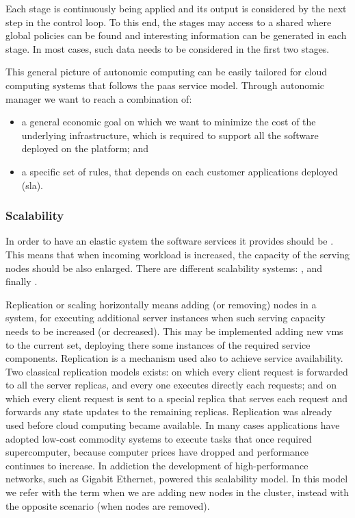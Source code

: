 Each stage is continuously being applied and its output is considered by the next step in the control
loop. To this end, the stages may access to a shared  where global policies
can be found and interesting information can be generated in each stage. In most cases, such data
needs to be considered in the first two stages.

This general picture of autonomic computing can be easily tailored for cloud computing systems that
follows the \ac{paas} service model. Through autonomic manager we want to reach a combination of:

\begin{itemize}
	\item{a general economic goal on which we want to minimize the cost of the underlying infrastructure,
		which is required to support all the software deployed on the platform; and}
	\item{a specific set of rules, that depends on each customer applications deployed (\ac{sla}).}
\end{itemize}

\subsubsection*{Scalability}
\label{sec:elasticity-requirements-scalability}
In order to have an elastic system the software services it provides should be . This
means that when incoming workload is increased, the capacity of the serving nodes should be also
enlarged. There are different scalability systems: ,  and
finally .

Replication or scaling horizontally means adding (or removing) nodes in a system, for executing additional
server instances when such serving capacity needs to be increased (or decreased). This may be implemented
adding new \ac{vm}s to the current set, deploying there some instances of the required service components.
Replication is a mechanism used also to achieve service availability. Two classical replication models
exists:  on which every client request is forwarded to all the server replicas,
and every one executes directly each requests; and  on which every client request
is sent to a special replica that serves each request and forwards any state updates to the remaining replicas.
Replication was already used before cloud computing became available. In many cases applications have adopted
low-cost commodity systems to execute tasks that once required supercomputer, because computer prices have
dropped and performance continues to increase. In addiction the development of high-performance networks,
such as Gigabit Ethernet, powered this scalability model. In this model we refer with the term
 when we are adding new nodes in the cluster, instead with  the opposite
scenario (when nodes are removed).

